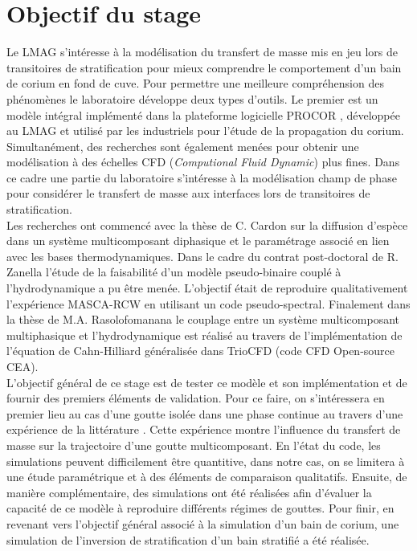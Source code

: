 \section{Objectif du stage}
Le LMAG s'intéresse à la modélisation du transfert de masse mis en jeu lors de transitoires de stratification pour mieux comprendre le comportement d'un bain de corium en fond de cuve. Pour permettre une meilleure compréhension des phénomènes le laboratoire développe deux types d'outils. Le premier est un modèle intégral implémenté dans la plateforme logicielle PROCOR \cite{le_tellier_phenomenological_2015}, développée au LMAG et utilisé par les industriels pour l’étude de la propagation du corium. Simultanément, des recherches sont également menées pour obtenir une modélisation à des échelles CFD (\textit{Computional Fluid Dynamic}) plus fines. Dans ce cadre une partie du laboratoire s'intéresse à la modélisation champ de phase pour considérer le transfert de masse aux interfaces lors de transitoires de stratification.\\ Les recherches ont commencé avec la thèse de C. Cardon \cite{cardon_modelisation_2016} sur la diffusion d'espèce dans un système multicomposant diphasique et le paramétrage associé en lien avec les bases thermodynamiques. Dans le cadre du contrat post-doctoral de R. Zanella l'étude de la faisabilité d'un modèle pseudo-binaire couplé à l'hydrodynamique a pu être menée. L'objectif était de reproduire qualitativement l'expérience MASCA-RCW \cites{zanella_two-_2020}{zanella_three-dimensional_2021} en utilisant un code pseudo-spectral. Finalement dans la thèse de M.A. Rasolofomanana \cite{rasolofomanana_modelisation_nodate} le couplage entre un système multicomposant multiphasique et l'hydrodynamique est réalisé au travers de l'implémentation de l'équation de Cahn-Hilliard généralisée dans TrioCFD  \cite{angeli_overview_2015} (code CFD Open-source CEA).\\
L'objectif général de ce stage est de tester ce modèle et son implémentation et de fournir des premiers éléments de validation. Pour ce faire, on s'intéressera en premier lieu au cas d'une goutte isolée dans une phase continue au travers d'une expérience de la littérature \cite{rao_influence_2015}. Cette expérience montre l’influence du transfert de masse sur la trajectoire d’une goutte multicomposant. En l'état du code, les simulations peuvent difficilement être quantitive, dans notre cas, on se limitera à une étude paramétrique et à des éléments de comparaison qualitatifs. Ensuite, de manière complémentaire, des simulations ont été réalisées afin d'évaluer la capacité de ce modèle à reproduire différents régimes de gouttes. Pour finir, en revenant vers l'objectif général associé à la simulation d'un bain de corium, une simulation de l'inversion de stratification d'un bain stratifié a été réalisée. \\
